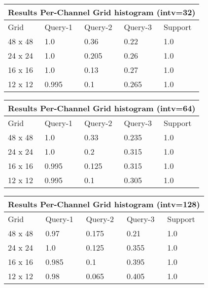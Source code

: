 \documentclass[12pt]{article}
\begin{document}
\begin{tabular}{ |p{1.5cm}||p{2cm}|p{2cm}|p{2cm}|p{2cm}|  }
    \hline
    \multicolumn{5}{|c|}{Results Per-Channel Grid histogram (intv=32)} \\
    \hline
    Grid & Query-1 & Query-2 & Query-3 & Support \\
    \hline
    48 x 48 & 1.0 & 0.36 & 0.22 & 1.0 \\
    \hline
    24 x 24 & 1.0 & 0.205 & 0.26 & 1.0 \\
    \hline
    16 x 16 & 1.0 & 0.13 & 0.27 & 1.0 \\
    \hline
    12 x 12 & 0.995 & 0.1 & 0.265 & 1.0 \\
    \hline
\end{tabular}

\begin{tabular}{ |p{1.5cm}||p{2cm}|p{2cm}|p{2cm}|p{2cm}|  }
    \hline
    \multicolumn{5}{|c|}{Results Per-Channel Grid histogram (intv=64)} \\
    \hline
    Grid & Query-1 & Query-2 & Query-3 & Support \\
    \hline
    48 x 48 & 1.0 & 0.33 & 0.235 & 1.0 \\
    \hline
    24 x 24 & 1.0 & 0.2 & 0.315 & 1.0 \\
    \hline
    16 x 16 & 0.995 & 0.125 & 0.315 & 1.0 \\
    \hline
    12 x 12 & 0.995 & 0.1 & 0.305 & 1.0 \\
    \hline
\end{tabular}

\begin{tabular}{ |p{1.5cm}||p{2cm}|p{2cm}|p{2cm}|p{2cm}|  }
    \hline
    \multicolumn{5}{|c|}{Results Per-Channel Grid histogram (intv=128)} \\
    \hline
    Grid & Query-1 & Query-2 & Query-3 & Support \\
    \hline
    48 x 48 & 0.97 & 0.175 & 0.21 & 1.0 \\
    \hline
    24 x 24 & 1.0 & 0.125 & 0.355 & 1.0 \\
    \hline
    16 x 16 & 0.985 & 0.1 & 0.395 & 1.0 \\
    \hline
    12 x 12 & 0.98 & 0.065 & 0.405 & 1.0 \\
    \hline
\end{tabular}
\end{document}
